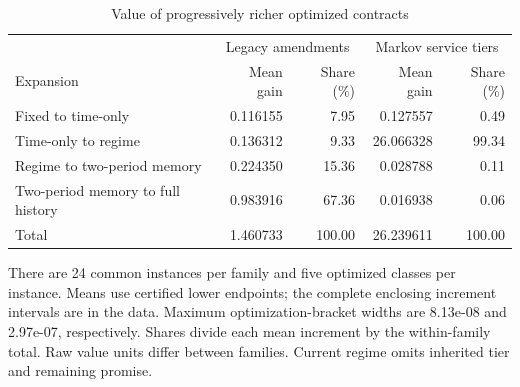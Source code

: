 \begin{table}[htbp]
\centering\small
\caption{Value of progressively richer optimized contracts}\label{tab:hierarchy}
\begin{tabular}{lrrrr}
\toprule
& \multicolumn{2}{c}{Legacy amendments} & \multicolumn{2}{c}{Markov service tiers} \\
Expansion & Mean gain & Share (\%) & Mean gain & Share (\%) \\ \midrule
Fixed to time-only & 0.116155 & 7.95 & 0.127557 & 0.49 \\
Time-only to regime & 0.136312 & 9.33 & 26.066328 & 99.34 \\
Regime to two-period memory & 0.224350 & 15.36 & 0.028788 & 0.11 \\
Two-period memory to full history & 0.983916 & 67.36 & 0.016938 & 0.06 \\
\midrule
Total & 1.460733 & 100.00 & 26.239611 & 100.00 \\
\bottomrule
\end{tabular}
\par\smallskip
\begin{minipage}{.98\textwidth}\footnotesize There are 24 common instances per family and five optimized classes per instance. Means use certified lower endpoints; the complete enclosing increment intervals are in the data. Maximum optimization-bracket widths are 8.13e-08 and 2.97e-07, respectively. Shares divide each mean increment by the within-family total. Raw value units differ between families. Current regime omits inherited tier and remaining promise.\end{minipage}
\end{table}
